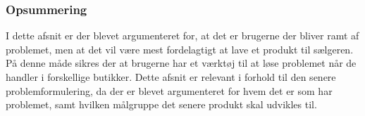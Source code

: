 \subsubsection{Opsummering}
I dette afsnit er der blevet argumenteret for, at det er brugerne der bliver ramt af problemet, men at det vil være mest fordelagtigt at lave et produkt til sælgeren. På denne måde sikres der at brugerne har et værktøj til at løse problemet når de handler i forskellige butikker. \newline Dette afsnit er relevant i forhold til den senere problemformulering, da der er blevet argumenteret for hvem det er som har problemet, samt hvilken målgruppe det senere produkt skal udvikles til.

